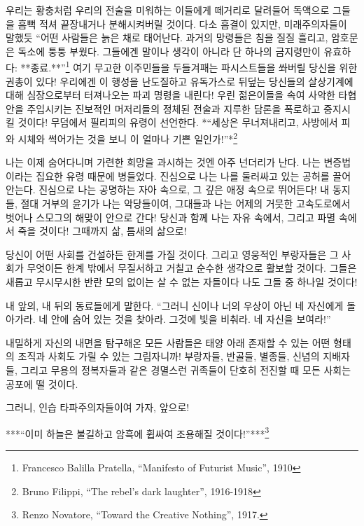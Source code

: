 \documentclass[11pt, b6paper, openany]{memoir}
\begin{document}
\begin{article}
우리는 황충처럼 우리의 전술을 미워하는 이들에게 떼거리로 달려들어 독액으로 그들을 흠뻑 적셔 끝장내거나 분해시켜버릴 것이다. 다소 흠결이 있지만, 미래주의자들이 말했듯 “어떤 사람들은 늙은 채로 태어난다. 과거의 망령들은 침을 질질 흘리고, 암호문은 독소에 퉁퉁 부웠다. 그들에겐 말이나 생각이 아니라 단 하나의 금지령만이 유효하다: **종료.**”\footnote{Francesco Balilla Pratella, “Manifesto of Futurist Music”, 1910} 여기 무고한 이주민들을 두들겨패는 파시스트들을 쏴버릴 당신을 위한 권총이 있다! 우리에겐 이 행성을 난도질하고 유독가스로 뒤덮는 당신들의 살상기계에 대해 심장으로부터 터져나오는 파괴 명령을 내린다! 우린 젊은이들을 속여 사악한 타협안을 주입시키는 진보적인 머저리들의 정체된 전술과 지루한 담론을 폭로하고 중지시킬 것이다! 무덤에서 필리피의 유령이 선언한다. *“세상은 무너져내리고, 사방에서 피와 시체와 썩어가는 것을 보니 이 얼마나 기쁜 일인가!”*\footnote{Bruno Filippi, “The rebel’s dark laughter”, 1916-1918}

나는 이제 숨어다니며 가련한 희망을 과시하는 것엔 아주 넌더리가 난다. 나는 변증법이라는 집요한 유령 때문에 병들었다. 진심으로 나는 나를 둘러싸고 있는 공허를 끌어안는다. 진심으로 나는 공명하는 자아 속으로, 그 깊은 애정 속으로 뛰어든다! 내 동지들, 절대 거부의 윤기가 나는 악당들이여, 그대들과 나는 어제의 거뭇한 고속도로에서 벗어나 스모그의 해맞이 안으로 간다! 당신과 함께 나는 자유 속에서, 그리고 파멸 속에서 죽을 것이다! 그때까지 삶, 틈새의 삶으로! 

    당신이 어떤 사회를 건설하든 한계를 가질 것이다. 그리고 영웅적인 부랑자들은 그 사회가 무엇이든 한계 밖에서 무질서하고 거칠고 순수한 생각으로 활보할 것이다. 그들은 새롭고 무시무시한 반란 모의 없이는 살 수 없는 자들이다
    나도 그들 중 하나일 것이다! 

    내 앞의, 내 뒤의 동료들에게 말한다. “그러니 신이나 너의 우상이 아닌 네 자신에게 돌아가라. 네 안에 숨어 있는 것을 찾아라. 그것에 빛을 비춰라. 네 자신을 보여라!” 

    내밀하게 자신의 내면을 탐구해온 모든 사람들은 태양 아래 존재할 수 있는 어떤 형태의 조직과 사회도 가릴 수 있는 그림자니까! 부랑자들, 반골들, 별종들, 신념의 지배자들, 그리고 무용의 정복자들과 같은 경멸스런 귀족들이 단호히 전진할 때 모든 사회는 공포에 떨 것이다. 

    그러니, 인습 타파주의자들이여 가자, 앞으로! 

    ***“이미 하늘은 불길하고 암흑에 휩싸여 조용해질 것이다!”***\footnote{Renzo Novatore, “Toward the Creative Nothing”, 1917.}

\end{article}
\end{document}
